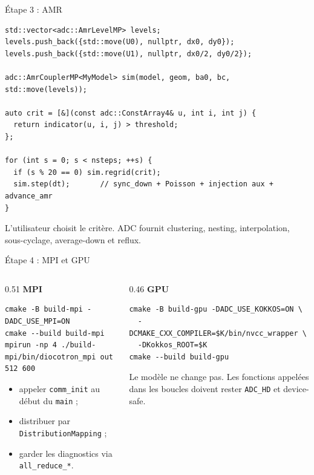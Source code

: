 \documentclass[10pt,aspectratio=169]{beamer}
\newcommand{\code}[1]{\texttt{\footnotesize #1}}
\begin{document}
\begin{frame}[fragile]{Étape 3 : AMR}
\begin{lstlisting}[style=cppslide]
std::vector<adc::AmrLevelMP> levels;
levels.push_back({std::move(U0), nullptr, dx0, dy0});
levels.push_back({std::move(U1), nullptr, dx0/2, dy0/2});

adc::AmrCouplerMP<MyModel> sim(model, geom, ba0, bc, std::move(levels));

auto crit = [&](const adc::ConstArray4& u, int i, int j) {
  return indicator(u, i, j) > threshold;
};

for (int s = 0; s < nsteps; ++s) {
  if (s % 20 == 0) sim.regrid(crit);
  sim.step(dt);       // sync_down + Poisson + injection aux + advance_amr
}
\end{lstlisting}

  \vspace{0.25cm}
  L'utilisateur choisit le critère. ADC fournit clustering, nesting, interpolation,
  sous-cyclage, average-down et reflux.
\end{frame}

\begin{frame}[fragile]{Étape 4 : MPI et GPU}
  \begin{columns}[T,onlytextwidth]
    \begin{column}{0.51\textwidth}
      \textbf{MPI}
\begin{lstlisting}[style=bashslide]
cmake -B build-mpi -DADC_USE_MPI=ON
cmake --build build-mpi
mpirun -np 4 ./build-mpi/bin/diocotron_mpi out 512 600
\end{lstlisting}
      \begin{itemize}
        \item appeler \code{comm\_init} au début du \code{main} ;
        \item distribuer par \code{DistributionMapping} ;
        \item garder les diagnostics via \code{all\_reduce\_*}.
      \end{itemize}
    \end{column}
    \begin{column}{0.46\textwidth}
      \textbf{GPU}
\begin{lstlisting}[style=bashslide]
cmake -B build-gpu -DADC_USE_KOKKOS=ON \
  -DCMAKE_CXX_COMPILER=$K/bin/nvcc_wrapper \
  -DKokkos_ROOT=$K
cmake --build build-gpu
\end{lstlisting}
      Le modèle ne change pas. Les fonctions appelées dans les boucles doivent rester
      \code{ADC\_HD} et device-safe.
    \end{column}
  \end{columns}
\end{frame}
\end{document}
